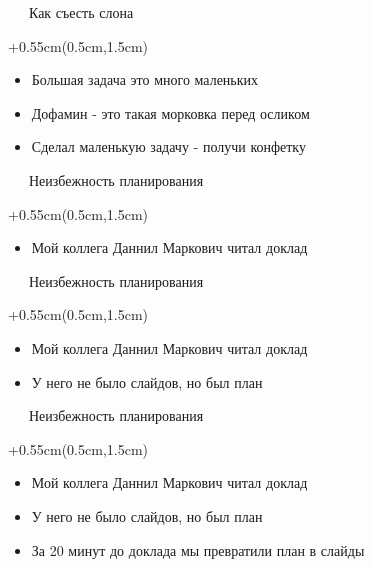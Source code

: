 \documentclass[xetex,18pt,aspectratio=169]{beamer}
\begin{document}
\begin{Large}
\begin{frame}{\ \ \ Как съесть слона}
\begin{textblock*}{\framewidth+0.55cm}(0.5cm,1.5cm)
\begin{itemize}
  \item Большая задача это много маленьких
  \item Дофамин - это такая морковка перед осликом
  \item Сделал маленькую задачу - получи конфетку
\end{itemize}
\end{textblock*}
\end{frame}

\begin{frame}{\ \ \ Неизбежность планирования}
\begin{textblock*}{\framewidth+0.55cm}(0.5cm,1.5cm)
\begin{itemize}
  \item Мой коллега Даннил Маркович читал доклад
\end{itemize}
\end{textblock*}
\end{frame}

\begin{frame}{\ \ \ Неизбежность планирования}
\begin{textblock*}{\framewidth+0.55cm}(0.5cm,1.5cm)
\begin{itemize}
  \item Мой коллега Даннил Маркович читал доклад
  \item У него не было слайдов, но был план
\end{itemize}
\end{textblock*}
\end{frame}

\begin{frame}{\ \ \ Неизбежность планирования}
\begin{textblock*}{\framewidth+0.55cm}(0.5cm,1.5cm)
\begin{itemize}
  \item Мой коллега Даннил Маркович читал доклад
  \item У него не было слайдов, но был план
  \item За 20 минут до доклада мы превратили план в слайды
\end{itemize}
\end{textblock*}
\end{frame}


\end{Large}
\end{document}
